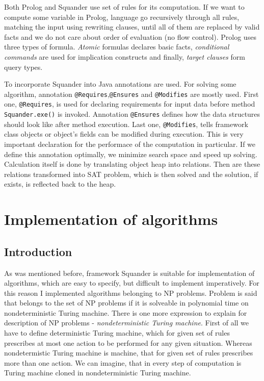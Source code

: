 \documentclass[11pt,twoside,a4paper]{book}
\begin{document}
Both Prolog and Squander use set of rules for its computation. If we want to
compute some variable in Prolog, language go recursively through all rules,
matching the input using rewriting clauses, until all of them are replaced by
valid facts and we do not care about order of evaluation (no flow control).
Prolog uses three types of formula. \textit{Atomic} formulas declares basic
facts, \textit{conditional commands} are used for implication constructs and
finally, \textit{target clauses} form query types.


To incorporate Squander into Java annotations are used. For solving some
algorithm, annotation \verb|@Requires|,\verb|@Ensures| and \verb|@Modifies| are
mostly used. First one, \verb|@Requires|, is used for declaring requirements for
input data before method \verb|Squander.exe()| is invoked. Annotation
\verb|@Ensures| defines how the data structures should look like after method
execution. Last one, \verb|@Modifies|, tells framework class objects or object's
fields can be modified during execution. This is very important declaration
for the performace of the computation in particular. If we define this
annotation optimally, we minimize search space and speed up solving. Calculation
itself is done by translating object heap into relations. Then are these
relations transformed into SAT problem, which is then solved and the solution,
if exists, is reflected back to the heap.
\chapter{Implementation of algorithms}

\section{Introduction}
As was mentioned before, framework Squander is suitable for implementation of
algorithms, which are easy to specify, but difficult to implement imperatively.
For this reason I implemented algorithms belonging to NP problems. Problem is
said that belongs to the set of NP problems if it is solveable in polynomial
time on nondeterministic Turing machine. There is one more expression to
explain for description of NP problems - \textit{nondeterministic Turing
machine}. First of all we have to define deterministic Turing machine, which for
given set of rules prescribes at most one action to be performed for any given
situation. Whereas nondetermistic Turing machine is machine, that for given set
of rules prescribes more than one action. We can imagine, that in every step of
computation is Turing machine cloned in nondeterministic Turing machine.
\end{document}

